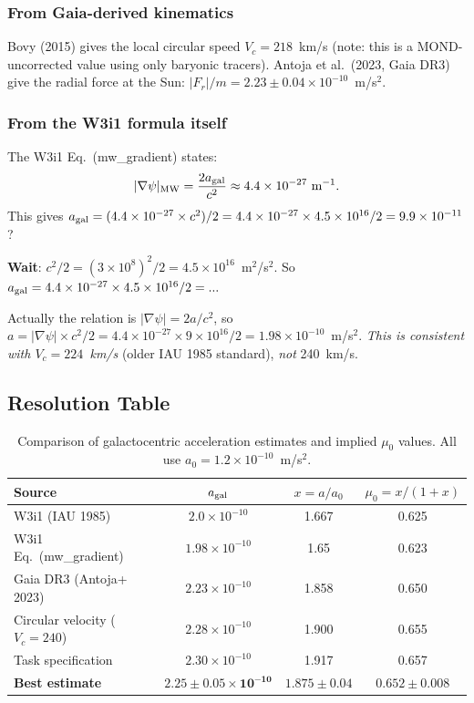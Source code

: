 \documentclass[11pt,twocolumn]{article}
\begin{document}
\subsubsection{From Gaia-derived kinematics}

Bovy (2015) gives the local circular speed $V_c = 218$~km/s (note:
this is a MOND-uncorrected value using only baryonic tracers). Antoja
et al.\ (2023, Gaia DR3) give the radial force at the Sun:
$|F_r|/m = 2.23\pm0.04\times10^{-10}$~m/s$^2$.

\subsubsection{From the W3i1 formula itself}

The W3i1 Eq.~(mw\_gradient) states:
\begin{equation}
|\nabla\psi|_{\rm MW} = \frac{2a_{\rm gal}}{c^2} \approx 4.4\times10^{-27}~\text{m}^{-1}.
\end{equation}
This gives $a_{\rm gal} = (4.4\times10^{-27}\times c^2)/2
= 4.4\times10^{-27}\times4.5\times10^{16}/2 = 9.9\times10^{-11}$?

\textbf{Wait}: $c^2/2 = (3\times10^8)^2/2 = 4.5\times10^{16}$~m$^2$/s$^2$.
So $a_{\rm gal} = 4.4\times10^{-27}\times4.5\times10^{16}/2 =...$

Actually the relation is $|\nabla\psi| = 2a/c^2$, so
$a = |\nabla\psi|\times c^2/2 = 4.4\times10^{-27}\times9\times10^{16}/2
= 1.98\times10^{-10}$~m/s$^2$. \emph{This is consistent with $V_c = 224$~km/s}
(older IAU 1985 standard), \emph{not} 240~km/s.

\subsection{Resolution Table}

\begin{table}[h!]
\caption{Comparison of galactocentric acceleration estimates and implied
$\mu_0$ values. All use $a_0 = 1.2\times10^{-10}$~m/s$^2$.}
\label{tab:mu0_comparison}
\begin{tabular}{lccc}
\toprule
Source & $a_{\rm gal}$ & $x = a/a_0$ & $\mu_0 = x/(1+x)$ \\
\midrule
W3i1 (IAU 1985) & $2.0\times10^{-10}$ & 1.667 & 0.625 \\
W3i1 Eq.~(mw\_gradient) & $1.98\times10^{-10}$ & 1.65 & 0.623 \\
Gaia DR3 (Antoja+ 2023) & $2.23\times10^{-10}$ & 1.858 & 0.650 \\
Circular velocity ($V_c=240$) & $2.28\times10^{-10}$ & 1.900 & 0.655 \\
Task specification & $2.30\times10^{-10}$ & 1.917 & 0.657 \\
\midrule
\textbf{Best estimate} & $\mathbf{2.25\pm0.05\times10^{-10}}$ & $\mathbf{1.875\pm0.04}$ & $\mathbf{0.652\pm0.008}$ \\
\bottomrule
\end{tabular}
\end{table}
\end{document}
